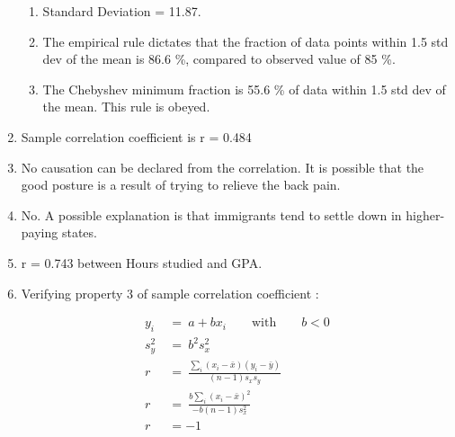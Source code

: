 \begin{enumerate}
\begin{enumerate}
		\item Standard Deviation = 11.87. \\
		
		\item The empirical rule dictates that the fraction of data points within 1.5 std dev of the mean is 86.6 \%, compared to observed value of 85 \%. \\
		
		\item The Chebyshev minimum fraction is 55.6 \% of data within 1.5 std dev of the mean. This rule is obeyed. \\
	\end{enumerate}
	
	\item Sample correlation coefficient is r = 0.484 \\
	
	\begin{figure}[H]
		\centering
	\end{figure}
	
	\item No causation can be declared from the correlation. It is possible that the good posture is a result of trying to relieve the back pain. \\
	
	\item No. A possible explanation is that immigrants tend to settle down in higher-paying states. \\
	
	\item r = 0.743 between Hours studied and GPA. \\
	
	\item 	Verifying property 3 of sample correlation coefficient : 
	
	\begin{subequations}
		\begin{align}
			y_i \ &=\  a + b x_i \qquad \text{with} \qquad b < 0 \\
			s_{y}^{2} \ &=\ b^2 s_{x}^2 \\
			r \ &=\ \frac{\sum_{i} (x_i - \bar{x}) (y_i - \bar{y})}{(n - 1) s_x s_y} \\
			r \ &=\ \frac{b \sum_{i} (x_i - \bar{x})^{2}}{- b (n - 1) s_{x}^{2}} \\
			r &= -1			
		\end{align}
	\end{subequations}\\
	

\end{enumerate}

